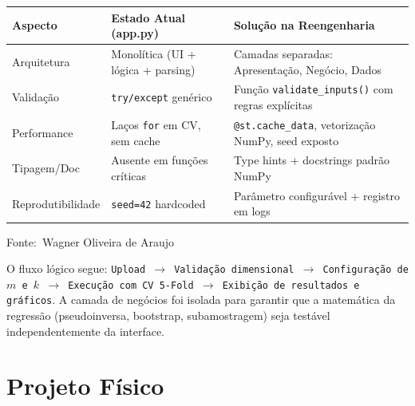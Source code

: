 \documentclass[12pt,a4paper]{article}
\newcommand{\oautor}{Wagner Oliveira de Araujo}
\begin{document}
\begin{quadro}[ht]
\centering
\small
\caption{Diagnóstico do código legado e arquitetura proposta}
\label{quadro:diagnostico}
\begin{threeparttable}
\begin{tabularx}{\textwidth}{|l|X|X|} \hline
\textbf{Aspecto} & \textbf{Estado Atual (app.py)} & \textbf{Solução na Reengenharia} \\ \hline
Arquitetura & Monolítica (UI + lógica + parsing) & Camadas separadas: Apresentação, Negócio, Dados \\ \hline
Validação & \texttt{try/except} genérico & Função \texttt{validate\_inputs()} com regras explícitas \\ \hline
Performance & Laços \texttt{for} em CV, sem cache & \texttt{@st.cache\_data}, vetorização NumPy, seed exposto \\ \hline
Tipagem/Doc & Ausente em funções críticas & Type hints + docstrings padrão NumPy \\ \hline
Reprodutibilidade & \texttt{seed=42} hardcoded & Parâmetro configurável + registro em logs \\ \hline
\end{tabularx}
\begin{tablenotes}[flushleft]
\footnotesize
\item Fonte:~\oautor
\end{tablenotes}
\end{threeparttable}
\end{quadro}

O fluxo lógico segue: \texttt{Upload $\rightarrow$ Validação dimensional $\rightarrow$ Configuração de $m$ e $k$ $\rightarrow$ Execução com CV 5-Fold $\rightarrow$ Exibição de resultados e gráficos}. A camada de negócios foi isolada para garantir que a matemática da regressão (pseudoinversa, bootstrap, subamostragem) seja testável independentemente da interface.

\section{Projeto Físico}
\end{document}
